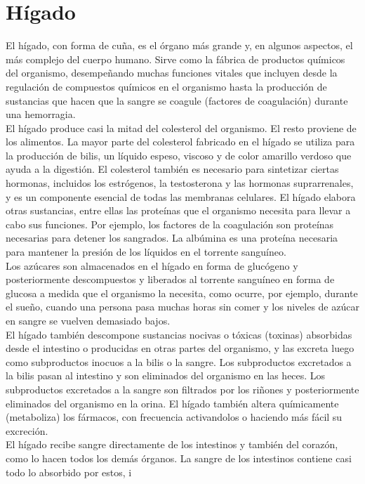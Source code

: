 \section{Hígado}
El hígado, con forma de cuña, es el órgano más grande y, en algunos aspectos, el más complejo del cuerpo humano. Sirve como la fábrica de productos químicos del organismo, desempeñando 
muchas funciones vitales que incluyen desde la regulación de compuestos químicos en el organismo hasta la producción de sustancias que hacen que la sangre se coagule (factores de coagulación) 
durante una hemorragia. \\
El hígado produce casi la mitad del colesterol del organismo. El resto proviene de los alimentos. La mayor parte del colesterol fabricado en el hígado se utiliza para la producción de bilis, 
un líquido espeso, viscoso y de color amarillo verdoso que ayuda a la digestión. El colesterol también es necesario para sintetizar ciertas hormonas, incluidos los estrógenos, la testosterona 
y las hormonas suprarrenales, y es un componente esencial de todas las membranas celulares. El hígado elabora otras sustancias, entre ellas las proteínas que el organismo necesita para llevar 
a cabo sus funciones. Por ejemplo, los factores de la coagulación son proteínas necesarias para detener los sangrados. La albúmina es una proteína necesaria para mantener la presión de los 
líquidos en el torrente sanguíneo.\\
Los azúcares son almacenados en el hígado en forma de glucógeno y posteriormente descompuestos y liberados al torrente sanguíneo en forma de glucosa a medida que el organismo la necesita, 
como ocurre, por ejemplo, durante el sueño, cuando una persona pasa muchas horas sin comer y los niveles de azúcar en sangre se vuelven demasiado bajos.\\
El hígado también descompone sustancias nocivas o tóxicas (toxinas) absorbidas desde el intestino o producidas en otras partes del organismo, y las excreta luego como subproductos inocuos 
a la bilis o la sangre. Los subproductos excretados a la bilis pasan al intestino y son eliminados del organismo en las heces. Los subproductos excretados a la sangre son filtrados por los 
riñones y posteriormente eliminados del organismo en la orina. El hígado también altera químicamente (metaboliza) los fármacos, con frecuencia activandolos o haciendo más fácil su excreción.\\
El hígado recibe sangre directamente de los intestinos y también del corazón, como lo hacen todos los demás órganos. La sangre de los intestinos contiene casi todo lo absorbido por estos, i
